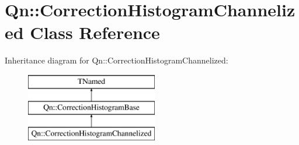 \hypertarget{classQn_1_1CorrectionHistogramChannelized}{}\section{Qn\+:\+:Correction\+Histogram\+Channelized Class Reference}
\label{classQn_1_1CorrectionHistogramChannelized}
Inheritance diagram for Qn\+:\+:Correction\+Histogram\+Channelized\+:\begin{figure}[H]
\begin{center}
\leavevmode
\includegraphics[height=3.000000cm]{classQn_1_1CorrectionHistogramChannelized}
\end{center}
\end{figure}
